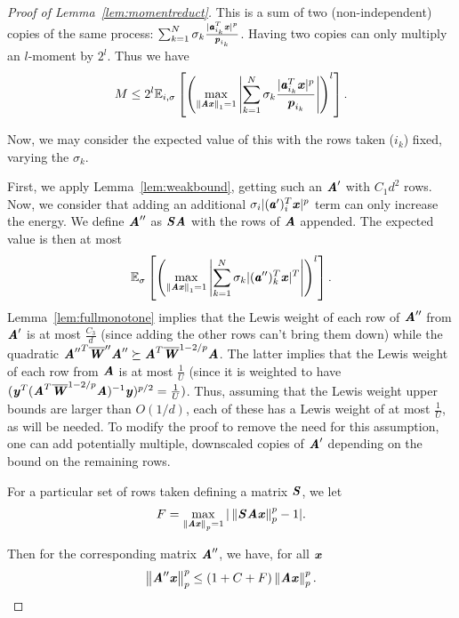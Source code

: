 \begin{proof}[Proof of Lemma~\ref{lem:momentreduct}]
This is a sum of two (non-independent) copies of the same process: $\sum_{k=1}^N \sigma_k \frac{|\aa_{i_k}^T \xx|^p}{\pp_{i_k}}$.
Having two copies can only multiply an $l$-moment by $2^l$.  Thus we have
\begin{equation*}
M \leq 2^l \expec{i, \sigma}{\left ( \max_{\norm{\AA \xx}_1 = 1} \left | \sum_{k=1}^N \sigma_k \frac{|\aa_{i_k}^T \xx|^p}{\pp_{i_k}} \right | \right )^l}.
\end{equation*}

Now, we may consider the expected value of this with the rows taken ($i_k$) fixed, varying the $\sigma_k$.

First, we apply Lemma~\ref{lem:weakbound}, getting such an $\AA'$ with $C_1 d^2$ rows.  Now, we consider that
adding an additional $\sigma_i | (\aa')_i^T \xx |^p$ term can only increase the energy.  We define $\AA''$ as
$\SS \AA$ with the rows of $\AA$ appended.  The expected value is then at most
\begin{equation*}
\expec{\sigma}{\left ( \max_{\norm{\AA \xx}_1 = 1} \left | \sum_{k=1}^N \sigma_k |(\aa'')_k^T \xx|^T \right | \right )^l}.
\end{equation*}
Lemma~\ref{lem:fullmonotone} implies that the Lewis weight
of each row of $\AA''$ from $\AA'$ is at most $\frac{C_3}{d}$ (since adding the other rows can't bring them down)
while the quadratic ${\AA''}^T \WWbar'' \AA'' \succeq \AA^T \WWbar^{1-2/p} \AA$.  The latter implies that the
Lewis weight of each row from $\AA$ is at most $\frac{1}{U}$ (since it is weighted to have
$(\yy^T (\AA^T \WWbar^{1-2/p} \AA)^{-1} \yy)^{p/2} = \frac{1}{U})$.  Thus, assuming that the Lewis weight
 upper bounds are larger than $O(1/d)$, each of these has a Lewis weight of at most $\frac{1}{U}$,
as will be needed. To modify the proof to remove the need for this assumption, one can add potentially
multiple, downscaled copies of $\AA'$ depending on the bound on the remaining rows.

For a particular set of rows taken defining a matrix $\SS$, we let
\begin{equation*}
F = \max_{\norm{\AA \xx}_p = 1} | \norm{\SS \AA \xx}_p^p - 1 |.
\end{equation*}

Then for the corresponding matrix $\AA''$, we have, for all $\xx$
\begin{equation*}
\norm{\AA'' \xx}_p^p \leq (1+C+F) \norm{\AA \xx}_p^p.
\end{equation*}


\end{proof}
